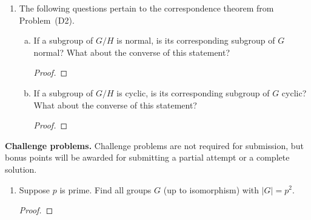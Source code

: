 \documentclass{article}
\theoremstyle{definition}
\numberwithin{equation}{section}
\renewcommand\>{\rangle}
\newcommand\<{\langle}
\newcommand\0{\mathbf{0}}
\begin{document}
\begin{enumerate}[(H1)]
\begin{enumerate}[(a)]
\item 
Prove that if $K \subseteq G/H$ is a subgroup, then $\varphi^{-1}(K)$ is a subgroup of $G$ containing $H$.  

\begin{proof}

\end{proof}


\item 
Prove that if $K \subseteq G$ is a subgroup with $H \subseteq K$, then $\varphi(K)$ is a subgroup of $G/H$.  

\begin{proof}

\end{proof}

\end{enumerate}

\item 
The following questions pertain to the correspondence theorem from Problem~(D2).  

\begin{enumerate}[(a)]
\item 
If a subgroup of $G/H$ is normal, is its corresponding subgroup of $G$ normal?  What about the converse of this statement?  

\begin{proof}

\end{proof}


\item 
If a subgroup of $G/H$ is cyclic, is its corresponding subgroup of $G$ cyclic?  What about the converse of this statement?  

\begin{proof}

\end{proof}

\end{enumerate}

\end{enumerate}


\bigskip
\noindent
\textbf{Challenge problems.}
Challenge problems are not required for submission, but bonus points will be awarded for submitting a partial attempt or a complete solution.  

\begin{enumerate}[(C1)]
\item 
Suppose $p$ is prime.  Find all groups $G$ (up to isomorphism) with $|G| = p^2$.  

\begin{proof}

\end{proof}

\end{enumerate}
\end{document}
